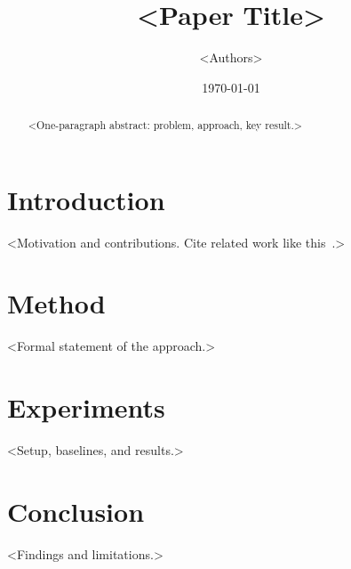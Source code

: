 \documentclass[11pt]{article}
\title{<Paper Title>}
\author{<Authors>}
\date{\today}
\begin{document}
\maketitle

\begin{abstract}
<One-paragraph abstract: problem, approach, key result.>
\end{abstract}

\section{Introduction}
<Motivation and contributions. Cite related work like this~\cite{example2024}.>

\section{Method}
<Formal statement of the approach.>

\section{Experiments}
<Setup, baselines, and results.>

\section{Conclusion}
<Findings and limitations.>



\end{document}
